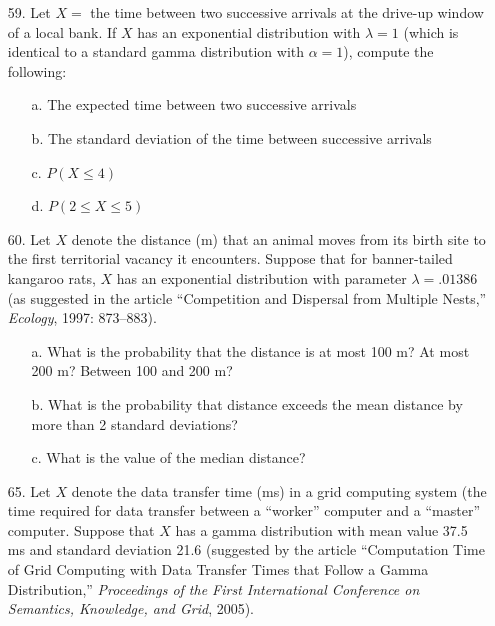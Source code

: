 \documentclass[letterpaper,12pt]{article}
\begin{document}
\maketitle

\begin{enumerate}
  \item[59.]
    Let $X =$ the time between two successive arrivals at the drive-up window of a local bank. If $X$ has an exponential distribution with $\lambda = 1$ (which is identical to a standard gamma distribution with $\alpha = 1$), compute the following:
    \begin{enumerate}
      \item[a.]
        The expected time between two successive arrivals
      \item[b.]
        The standard deviation of the time between successive arrivals
      \item[c.]
        $P(X \le 4)$
      \item[d.]
        $P(2 \le X \le 5)$
    \end{enumerate}
  \item[60.]
    Let $X$ denote the distance (m) that an animal moves from its birth site to the first territorial vacancy it encounters. Suppose that for banner-tailed kangaroo rats, $X$ has an exponential distribution with parameter $\lambda = .01386$ (as suggested in the article ``Competition and Dispersal from Multiple Nests,'' \textit{Ecology}, 1997: 873–883).
    \begin{enumerate}
      \item[a.]
        What is the probability that the distance is at most 100 m? At most 200 m? Between 100 and 200 m?
      \item[b.]
        What is the probability that distance exceeds the mean distance by more than 2 standard deviations?
      \item[c.]
        What is the value of the median distance?
    \end{enumerate}
  \item[65.]
    Let $X$ denote the data transfer time (ms) in a grid computing system (the time required for data transfer between a ``worker'' computer and a ``master'' computer. Suppose that $X$ has a gamma distribution with mean value 37.5 ms and standard deviation 21.6 (suggested by the article ``Computation Time of Grid Computing with Data Transfer Times that Follow a Gamma Distribution,'' \textit{Proceedings of the First International Conference on Semantics, Knowledge, and Grid}, 2005).
    \begin{enumerate}

\end{enumerate}
\end{enumerate}
\end{document}
